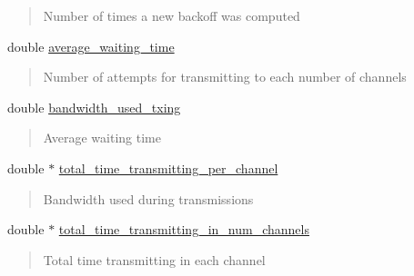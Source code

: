 \begin{DoxyCompactItemize}
\begin{DoxyCompactList}
\begin{quote}
Number of times a new backoff was computed \end{quote}
\end{DoxyCompactList}\item 
\mbox{\label{structPerformance_a63378aa6b18ee60ef89ac0f16711440c}} 
double \hyperlink{structPerformance_a63378aa6b18ee60ef89ac0f16711440c}{average\+\_\+waiting\+\_\+time}
\begin{DoxyCompactList}\small\item\em \begin{quote}
Number of attempts for transmitting to each number of channels \end{quote}
\end{DoxyCompactList}\item 
\mbox{\label{structPerformance_aa376625e310e24deb0b20230fbf2492f}} 
double \hyperlink{structPerformance_aa376625e310e24deb0b20230fbf2492f}{bandwidth\+\_\+used\+\_\+txing}
\begin{DoxyCompactList}\small\item\em \begin{quote}
Average waiting time \end{quote}
\end{DoxyCompactList}\item 
\mbox{\label{structPerformance_a323ea602625baf4c22f2ff8a2f73a115}} 
double $\ast$ \hyperlink{structPerformance_a323ea602625baf4c22f2ff8a2f73a115}{total\+\_\+time\+\_\+transmitting\+\_\+per\+\_\+channel}
\begin{DoxyCompactList}\small\item\em \begin{quote}
Bandwidth used during transmissions \end{quote}
\end{DoxyCompactList}\item 
\mbox{\label{structPerformance_a785a294ee3a3dbef4b918a1acafb088b}} 
double $\ast$ \hyperlink{structPerformance_a785a294ee3a3dbef4b918a1acafb088b}{total\+\_\+time\+\_\+transmitting\+\_\+in\+\_\+num\+\_\+channels}
\begin{DoxyCompactList}\small\item\em \begin{quote}
Total time transmitting in each channel \end{quote}

\end{DoxyCompactList}
\end{DoxyCompactItemize}
